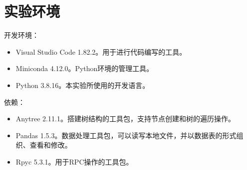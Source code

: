 \section{实验环境}

开发环境：
\begin{itemize}
    \item Visual Studio Code 1.82.2。用于进行代码编写的工具。
    \item Miniconda 4.12.0。Python环境的管理工具。
    \item Python 3.8.16。本实验所使用的开发语言。
\end{itemize}

依赖：
\begin{itemize}
    \item Anytree 2.11.1。搭建树结构的工具包，支持节点创建和树的遍历操作。
    \item Pandas 1.5.3。数据处理工具包，可以读写本地文件，并以数据表的形式组织、查看和修改。
    \item Rpyc 5.3.1。用于RPC操作的工具包。
\end{itemize}